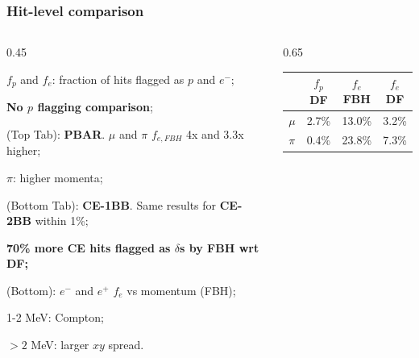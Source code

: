 \documentclass{beamer}
\begin{document}
\begin{frame}
    \frametitle{Hit-level comparison}
    \vspace{-3mm}
    \begin{columns}
    \begin{column}{0.45\framewidth}
        \setlength{\leftmargini}{0.7em}
\begin{itemize}
{\footnotesize
    \item $f_p$ and $f_e$: fraction of hits flagged as $p$ and $e^-$;
    \vspace{2mm}
    \item \textbf{No $p$ flagging comparison};
    \vspace{2mm}
    \item (Top Tab): \textbf{PBAR}. $\mu$ and $\pi$ $f_{e,FBH}$ 4x and 3.3x higher;
    \vspace{2mm}
      \item $\pi$: higher momenta;
      \vspace{2mm}
      \item (Bottom Tab): \textbf{CE-1BB}. Same results for \textbf{CE-2BB} within 1\%;
      \vspace{2mm}
      \item \textbf{70\% more CE hits flagged as $\delta$s by FBH wrt DF;}
      \vspace{2mm}
      \item (Bottom): $e^-$ and $e^+$ $f_e$ vs momentum (FBH);
      \vspace{2mm}
      \item 1-2 MeV: Compton;
      \vspace{2mm}
      \item $>2$ MeV: larger $xy$ spread.
    }
\end{itemize}
        \end{column}
         \begin{column}{0.65\framewidth}
        \begin{table}[h!]
        \centering
        \hspace*{-0.5em}
        \renewcommand{\arraystretch}{0.7}
        \begin{tabular}{| c | c | c | c|} 
        \hline
         &  {\scriptsize $f_{p}$ DF} &  {\scriptsize $f_{e}$ FBH} & {\scriptsize $f_{e}$ DF}\\
        \hline
        {\scriptsize $\mu$} &  {\scriptsize 2.7\%}  & {\scriptsize 13.0\%} & {\scriptsize 3.2\%}\\
        \hline
        {\scriptsize $\pi$} & {\scriptsize 0.4\%} & {\scriptsize 23.8\%} & {\scriptsize 7.3\%} \\
        \hline
        \end{tabular}
        \label{tab:0bbpbar}
        

\end{table}
\end{column}
\end{columns}
\end{frame}
\end{document}
